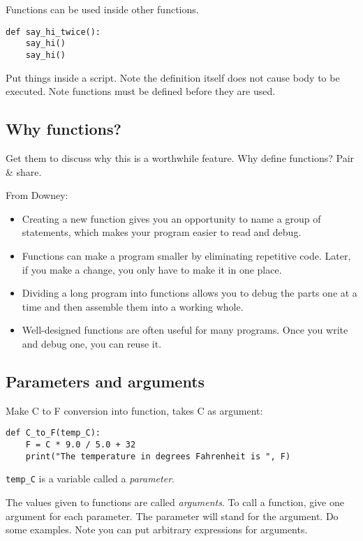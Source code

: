 \documentclass{article}
\begin{document}
Functions can be used inside other functions.

\begin{verbatim}
def say_hi_twice():
    say_hi()
    say_hi()
\end{verbatim}

Put things inside a script.  Note the definition itself does not cause
body to be executed.  Note functions must be defined before they are
used.

\subsection*{Why functions?}

Get them to discuss why this is a worthwhile feature.  Why define
functions?  Pair \& share.

From Downey:

\begin{itemize}
\item Creating a new function gives you an opportunity to name a group
  of statements, which makes your program easier to read and debug.
\item  Functions can make a program smaller by eliminating repetitive code.
  Later, if you make a change, you only have to make it in one place.
\item Dividing a long program into
  functions allows you to debug the parts one at a time and then
  assemble them into a working whole.
\item Well-designed functions are often useful for many programs.
  Once you write and debug one, you can reuse it.
\end{itemize}

\subsection*{Parameters and arguments}

Make C to F conversion into function, takes C as argument:
\begin{verbatim}
def C_to_F(temp_C):
    F = C * 9.0 / 5.0 + 32
    print("The temperature in degrees Fahrenheit is ", F)
\end{verbatim}

\verb|temp_C| is a variable called a \emph{parameter}.

The values given to functions are called \emph{arguments}.  To call a
function, give one argument for each parameter.  The parameter will
stand for the argument.  Do some examples.  Note you can put arbitrary
expressions for arguments.
\end{document}
